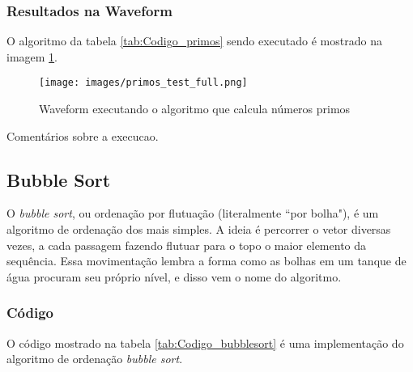 \documentclass{article}
\newcommand\tab[1][0.50cm]{\hspace*{#1}}
\begin{document}
			\subsubsection[Waveform]{Resultados na Waveform}
			
			\tab O algoritmo da tabela \ref{tab:Codigo_primos} sendo executado \'e mostrado na imagem \ref{fig:Primos_test_full}.
			
				\begin{figure}[H]
					\centering
					\caption[Waveform N\'umeros primos]{Waveform executando o algoritmo que calcula n\'umeros primos}
					\label{fig:Primos_test_full}
					\texttt{[image: images/primos\_test\_full.png]}
				\end{figure}
			
			Coment\'arios sobre a execucao.
			
		\subsection[Bubble Sort]{Bubble Sort}
			
			\tab O \textit{bubble sort}, ou ordena\c{c}\~{a}o por flutua\c{c}\~{a}o (literalmente ``por bolha"), \'e um algoritmo de ordena\c{c}\~{a}o dos mais simples. A ideia \'e percorrer o vetor diversas vezes, a cada passagem fazendo flutuar para o topo o maior elemento da sequ\^encia. Essa movimenta\c{c}\~{a}o lembra a forma como as bolhas em um tanque de \'agua procuram seu pr\'oprio nível, e disso vem o nome do algoritmo.
			
			\subsubsection[C\'odigo]{C\'odigo}
			
				\tab O c\'odigo mostrado na tabela \ref{tab:Codigo_bubblesort} \'e uma implementa\c{c}\~{a}o do algoritmo de ordena\c{c}\~{a}o \textit{bubble sort}.
				
\end{document}
